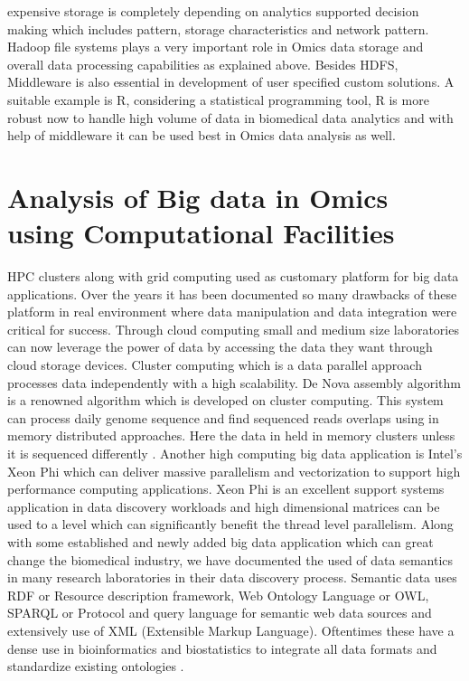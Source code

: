 \documentclass[sigconf]{acmart}
\begin{document}
expensive storage is completely depending on analytics supported decision making which includes pattern, storage characteristics and network pattern. Hadoop file systems plays a very important role in Omics data storage and overall data processing capabilities as explained above. Besides HDFS, Middleware is also essential in development of user specified custom solutions. A suitable example is R, considering a statistical programming tool, R is more robust now to handle high volume of data in biomedical data analytics and with help of middleware it can be used best in Omics data analysis as well.

\section{Analysis of Big data in Omics using Computational Facilities} HPC clusters along with grid computing used as customary platform for big data applications. Over the years it has been documented so many drawbacks of these platform in real environment where data manipulation and data integration were critical for success. Through cloud computing small and medium size laboratories can now leverage the power of data by accessing the data they want through cloud storage devices. Cluster computing which is a data parallel approach processes data independently with a high scalability. De Nova assembly algorithm is a renowned algorithm which is developed on cluster computing. This system can process daily genome sequence and find sequenced reads overlaps using in memory distributed approaches. Here the data in held in memory clusters unless it is sequenced differently \cite{editor11}. Another high computing big data application is Intel’s Xeon Phi which can deliver massive parallelism and vectorization to support high performance computing applications. Xeon Phi is an excellent support systems application in data discovery workloads and high dimensional matrices can be used to a level which can significantly benefit the thread level parallelism. Along with some established and newly added big data application which can great change the biomedical industry, we have documented the used of data semantics in many research laboratories in their data discovery process. Semantic data uses RDF or Resource description framework, Web Ontology Language or OWL, SPARQL or Protocol and query language for semantic web data sources and extensively use of XML (Extensible Markup Language). Oftentimes these have a dense use in bioinformatics and biostatistics to integrate all data formats and standardize existing ontologies \cite{editor11}. 
\end{document}
